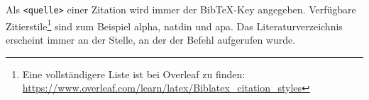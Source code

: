 Als \texttt{<quelle>} einer Zitation wird immer der Bib\TeX-Key angegeben.
Verfügbare Zitierstile\footnote{Eine vollständigere Liste ist bei Overleaf zu finden: \url{https://www.overleaf.com/learn/latex/Biblatex_citation_styles}} sind zum Beispiel alpha, natdin und apa.
Das Literaturverzeichnis erscheint immer an der Stelle, an der der Befehl \texttt{} aufgerufen wurde.


